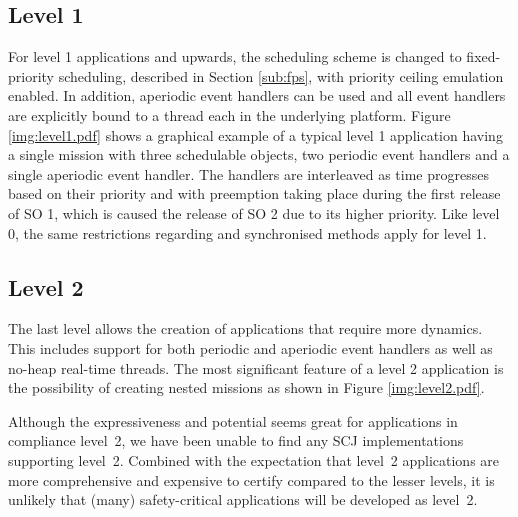 \subsection{Level 1}
For level 1 applications and upwards, the scheduling scheme is changed to fixed-priority scheduling, described in Section \ref{sub:fps}, with priority ceiling emulation enabled. In addition, aperiodic event handlers can be used and all event handlers are explicitly bound to a thread each in the underlying platform. Figure \ref{img:level1.pdf} shows a graphical example of a typical level 1 application having a single mission with three schedulable objects, two periodic event handlers and a single aperiodic event handler. The handlers are interleaved as time progresses based on their priority and with preemption taking place during the first release of SO 1, which is caused the release of SO 2 due to its higher priority. Like level 0, the same restrictions regarding  and synchronised methods apply for level 1.


\subsection{Level 2}
The last level allows the creation of applications that require more dynamics. This includes support for both periodic and aperiodic event handlers as well as no-heap real-time threads. The most significant feature of a level 2 application is the possibility of creating nested missions as shown in Figure \ref{img:level2.pdf}.


Although the expressiveness and potential seems great for applications in compliance level~2, we have been unable to find any SCJ implementations supporting level~2. Combined with the expectation that level~2 applications are more comprehensive and expensive to certify compared to the lesser levels, it is unlikely that (many) safety-critical applications will be developed as level~2.
